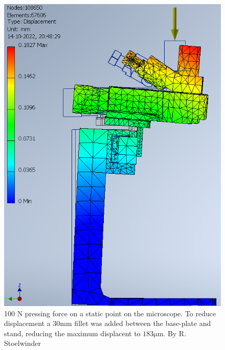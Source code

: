 \documentclass[11pt]{article}
\begin{document}
\begin{figure}[H]
  \centering
  \begin{minipage}[b]{0.45\textwidth}
    \includegraphics[width=\textwidth]{img/rigidity_simulation/study_4.png}
    \caption{100 N pressing force on a static point on the microscope. To reduce displacement a $30\mathrm{mm}$ fillet was added between the base-plate and stand, reducing the maximum displacent to $183\mathrm{\mu m}$. By R. Stoelwinder }
    \label{fig:disp_study5}
  \end{minipage}
  \hfill
  \begin{minipage}[b]{0.45\textwidth}

\end{minipage}
\end{figure}
\end{document}
